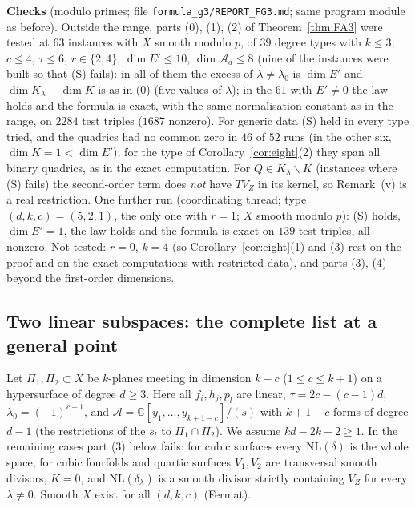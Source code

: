 \documentclass[11pt]{article}
\numberwithin{equation}{section}
\theoremstyle{remark}
\newcommand{\CC}{\mathbb{C}}
\newcommand{\NL}{\mathrm{NL}}
\newcommand{\VZ}{V_Z}
\newcommand{\cA}{\mathcal{A}}
\newcommand{\lz}{\lambda_0}
\newcommand{\run}[1]{\medskip\noindent\textbf{#1}}
\begin{document}
\run{Checks} (modulo primes; file \texttt{formula\_g3/REPORT\_FG3.md}; same program module as before). Outside
the range, parts (0), (1), (2) of Theorem~\ref{thm:FA3} were tested at $63$ instances with $X$ smooth modulo $p$,
of $39$ degree types with $k\le3$, $c\le4$, $\tau\le6$, $r\in\{2,4\}$, $\dim E'\le10$, $\dim\cA_d\le8$ (nine of the
instances were built so that (S) fails): in all of them the excess of $\lambda\ne\lz$ is $\dim E'$ and
$\dim K_\lambda-\dim K$ is as in (0) (five values of $\lambda$); in the $61$ with $E'\ne0$ the law holds and the
formula is exact, with the same normalisation constant as in the range, on $2284$ test triples ($1687$ nonzero).
For generic data (S) held in every type tried, and the quadrics had no common zero in $46$ of $52$ runs (in the
other six, $\dim K=1<\dim E'$); for the type of Corollary~\ref{cor:eight}(2) they span all binary quadrics, as
in the exact computation. For $Q\in K_\lambda\smallsetminus K$ (instances where (S) fails) the second-order term
does \emph{not} have $T\VZ$ in its kernel, so Remark~(v) is a real restriction. One further run (coordinating
thread; type $(d,k,c)=(5,2,1)$, the only one with $r=1$; $X$ smooth modulo $p$): (S) holds, $\dim E'=1$, the law
holds and the formula is exact on $139$ test triples, all nonzero. Not tested: $r=0$, $k=4$
(so Corollary~\ref{cor:eight}(1) and (3) rest on the proof and on the exact computations with restricted data), and
parts (3), (4) beyond the first-order dimensions.


\subsection{Two linear subspaces: the complete list at a general point}\label{sec:lin}

Let $\Pi_1,\Pi_2\subset X$ be $k$-planes meeting in dimension $k-c$ ($1\le c\le k+1$) on a hypersurface of degree
$d\ge3$. Here all $f_i,h_j,p_l$ are linear, $\tau=2c-(c-1)d$, $\lz=(-1)^{c-1}$, and
$\cA=\CC[y_1,\dots,y_{k+1-c}]/(\bar s)$ with $k+1-c$ forms of degree $d-1$ (the restrictions of the $s_l$ to
$\Pi_1\cap\Pi_2$). We assume $kd-2k-2\ge1$. In the remaining cases part (3) below fails: for cubic surfaces every $\NL(\delta)$ is
the whole space; for cubic fourfolds and quartic surfaces $V_1,V_2$ are transversal smooth divisors, $K=0$, and
$\NL(\delta_\lambda)$ is a smooth divisor strictly containing $\VZ$ for every $\lambda\ne0$. Smooth $X$ exist for all $(d,k,c)$ (Fermat).
\end{document}
